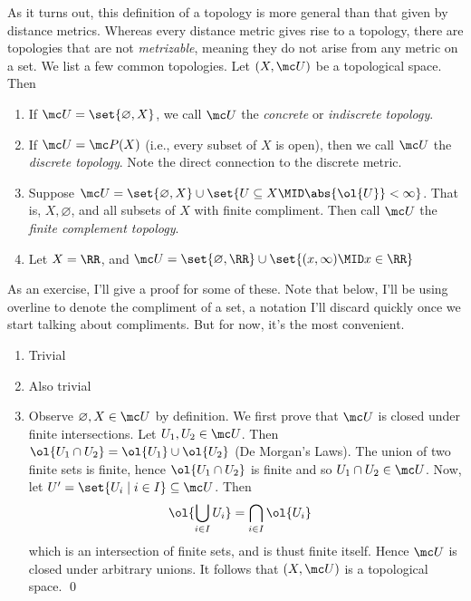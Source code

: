\documentclass{fkbook}
\theoremstyle{snazzydefinition}
\begin{document}
\begin{adjustwidth}{1em}{1em}
  As it turns out, this definition of a topology is more general than
  that given by distance metrics. Whereas every distance metric gives
  rise to a topology, there are topologies that are not
  \emph{metrizable}, meaning they do not arise from any metric on a
  set. We list a few common topologies. Let $(X, \mc U)$ be a
  topological space. Then
  \begin{enumerate}[label=\arabic*.]
    \item If $\mc U = \set{\varnothing, X}$, we call $\mc U$ the
      \emph{concrete} or \emph{indiscrete topology}.
    \item If $\mc U = \mc P(X)$ (i.e., every subset of $X$ is open),
      then we call $\mc U$ the \emph{discrete topology}. Note the
      direct connection to the discrete metric.
    \item Suppose $\mc U = \set{\varnothing, X} \cup \set{U \subseteq
        X \MID \abs{\ol{U}} < \infty}$. That is, $X, \varnothing$, and
      all subsets of $X$ with finite compliment. Then call $\mc U$ the
      \emph{finite complement topology}.
    \item Let $X = \RR$, and $\mc U = \set{\varnothing, \RR} \cup
      \set{(x, \infty) \MID x \in \RR}$
  \end{enumerate}
  As an exercise, I'll give a proof for some of these. Note that
  below, I'll be using overline to denote the compliment of a set, a
  notation I'll discard quickly once we start talking about
  compliments. But for now, it's the most convenient.
  \begin{enumerate}[label=\arabic*.]
    \item Trivial
    \item Also trivial
    \item Observe $\varnothing, X \in \mc U$ by definition. We first
      prove that $\mc U$ is closed under finite intersections. Let
      $U_1, U_2 \in \mc U$. Then $\ol{U_1 \cap U_2} = \ol{U_1} \cup
      \ol{U_2}$ (De Morgan's Laws). The union of two finite sets is
      finite, hence $\ol{U_1 \cap U_2}$ is finite and so $U_1 \cap U_2
      \in \mc U$. Now, let $U' = \set{U_i \mid i \in I} \subseteq \mc
      U$. Then
      \begin{align*}
        \ol{\bigcup_{i \in I} U_i}
        &= \bigcap_{i \in I} \ol{U_i}
      \end{align*}
      which is an intersection of finite sets, and is thust finite
      itself. Hence $\mc U$ is closed under arbitrary unions. It
      follows that $(X, \mc U)$ is a topological space. \qed

\end{enumerate}
\end{adjustwidth}
\end{document}
